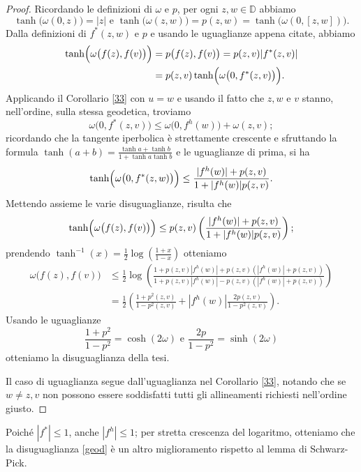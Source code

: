\begin{proof}
  Ricordando le definizioni di $\omega$ e $p$, per ogni $z,w \in \mathbb{D}$ abbiamo
  $$\tanh\bigl(\omega(0,z)\bigr)=|z|\text{ e }\tanh\bigl(\omega(z,w)\bigr)=p(z,w)=\tanh\bigl(\omega(0,[z,w])\bigl).$$
  Dalla definizioni di $f^*(z,w)$ e $p$ e usando le uguaglianze appena citate, abbiamo
  \begin{align*}
    \tanh\Bigl(\omega\bigl(f(z),f(v)\bigr)\Bigr)&=p\bigl(f(z),f(v)\bigr)=p(z,v)|f^*(z,v)| \\
    &=p(z,v)\tanh\Bigl(\omega\bigl(0,f^*(z,v)\bigr)\Bigr).
  \end{align*}
  Applicando il Corollario \ref{33} con $u=w$ e usando il fatto che $z,w$ e $v$ stanno, nell'ordine, sulla stessa geodetica, troviamo
  $$\omega\bigl(0,f^*(z,v)\bigr) \le \omega\bigl(0,f^h(w)\bigr)+\omega(z,v);$$
  ricordando che la tangente iperbolica è strettamente crescente e sfruttando la formula $\tanh(a+b)=\frac{\tanh{a}+\tanh{b}}{1+\tanh{a}\tanh{b}}$ e le uguaglianze di prima, si ha
  $$\tanh\Bigl(\omega\bigl(0,f^*(z,w)\bigr)\Bigr) \le\frac{|f^h(w)|+p(z,v)}{1+|f^h(w)|p(z,v)}.$$
  Mettendo assieme le varie disuguaglianze, risulta che
  $$\tanh\Bigl(\omega\bigl(f(z),f(v)\bigr)\Bigr) \le p(z,v)\left(\frac{|f^h(w)|+p(z,v)}{1+|f^h(w)|p(z,v)}\right);$$
  prendendo $\tanh^{-1}(x)=\frac{1}{2}\log\left(\frac{1+x}{1-x}\right)$ otteniamo
  \begin{align*}
    \omega\bigl(f(z),f(v)\bigr) & \le \frac{1}{2}\log\left(\frac{1+p(z,v)|f^h(w)|+p(z,v)(|f^h(w)|+p(z,v))}{1+p(z,v)|f^h(w)|-p(z,v)(|f^h(w)|+p(z,v))}\right) \\
    & =\frac{1}{2}\left(\frac{1+p^2(z,v)}{1-p^2(z,v)}+|f^h(w)|\frac{2p(z,v)}{1-p^2(z,v)}\right).
  \end{align*}
  Usando le uguaglianze
  $$\frac{1+p^2}{1-p^2}=\cosh(2\omega) \text{ e } \frac{2p}{1-p^2}=\sinh(2\omega)$$
  otteniamo la disuguaglianza della tesi.

  Il caso di uguaglianza segue dall'uguaglianza nel Corollario \ref{33}, notando che se $w\not=z,v$ non possono essere soddisfatti tutti gli allineamenti richiesti nell'ordine giusto.
\end{proof}

\begin{oss}
  Poiché $|f^*| \le 1$, anche $|f^h| \le 1$; per stretta crescenza del logaritmo, otteniamo che la disuguaglianza \eqref{geod} è un altro miglioramento rispetto al lemma di Schwarz-Pick.
\end{oss}

